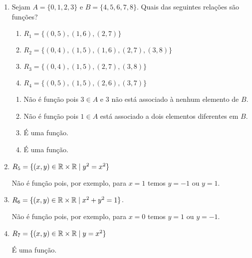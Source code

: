 \begin{exemplos}
	\begin{enumerate}[label={\arabic*})]
		\item Sejam $A = \{0,1,2,3\}$ e $B = \{4,5,6,7,8\}$. Quais das seguintes rela{\c c}{\~o}es s{\~a}o fun{\c c}{\~o}es?
			\begin{enumerate}[label={\alph*})]
				\item $R_1 = \{(0,5),(1,6),(2,7)\}$

				\item $R_2 = \{(0,4),(1,5),(1,6),(2,7),(3,8)\}$

				\item $R_3 = \{(0,4),(1,5),(2,7),(3,8)\}$

				\item $R_4 = \{(0,5),(1,5),(2,6),(3,7)\}$
			\end{enumerate}

			\begin{solucao}
				\begin{enumerate}[label={\alph*})]
					\item N\~ao \'e fun\c{c}\~ao pois $3 \in A$ e $3$ n\~ao est\'a associado {\`a} nenhum elemento de $B$.

					\item N\~ao \'e fun\c{c}\~ao pois $1 \in A$ est\'a associado a dois elementos diferentes em $B$.

					\item \'E uma fun\c{c}\~ao.

					\item \'E uma fun\c{c}\~ao.
				\end{enumerate}
			\end{solucao}

		\item $R_{5} = \{(x,y) \in \mathbb{R}  \times \mathbb{R}  \mid y^2 = x^2\}$
			\begin{solucao}
			 	N\~ao \'e fun\c{c}\~ao pois, por exemplo, para $x = 1$ temos $y = -1$ ou $y = 1$.
			\end{solucao}

		\item $R_{6} = \{(x,y) \in \mathbb{R}  \times \mathbb{R}  \mid x^2 + y^2 = 1\}$.
			\begin{solucao}
			 	N\~ao \'e fun\c{c}\~ao pois, por exemplo, para $x = 0$ temos $y = 1$ ou $y = -1$.
			 \end{solucao}

		\item $R_{7} = \{(x,y) \in \mathbb{R}  \times \mathbb{R} \mid y = x^2\}$
			\begin{solucao}
			 	\'E uma fun\c{c}\~ao.
			\end{solucao}
	\end{enumerate}
\end{exemplos}


